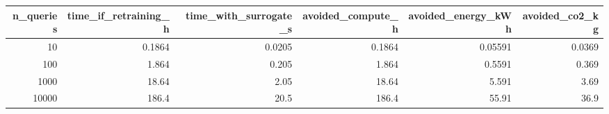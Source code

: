 \begin{tabular}{rrrrrr}
\toprule
 n\_queries &  time\_if\_retraining\_h &  time\_with\_surrogate\_s &  avoided\_compute\_h &  avoided\_energy\_kWh &  avoided\_co2\_kg \\
\midrule
        10 &                0.1864 &                 0.0205 &             0.1864 &             0.05591 &          0.0369 \\
       100 &                 1.864 &                  0.205 &              1.864 &              0.5591 &           0.369 \\
      1000 &                 18.64 &                   2.05 &              18.64 &               5.591 &            3.69 \\
     10000 &                 186.4 &                   20.5 &              186.4 &               55.91 &            36.9 \\
\bottomrule
\end{tabular}
